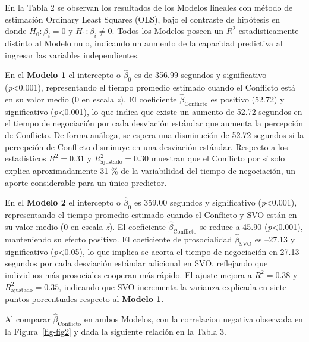 \documentclass[
  spanish,
  10pt,
]{article}
\begin{document}
En la Tabla 2 se observan los resultados de los Modelos lineales con
método de estimación Ordinary Least Squares (OLS), bajo el contraste de
hipótesis en donde \(H_0:\beta_i=0\) y \(H_1:\beta_i\neq0\). Todos los
Modelos poseen un \(R^2\) estadisticamente distinto al Modelo nulo,
indicando un aumento de la capacidad predictiva al ingresar las
variables independientes.

En el \textbf{Modelo 1} el intercepto o \(\hat{\beta}_0\) es de 356.99
segundos y significativo (\emph{p}\textless0.001), representando el
tiempo promedio estimado cuando el Conflicto está en su valor medio (0
en escala \emph{z}). El coeficiente \(\hat{\beta}_{\text{Conflicto}}\)
es positivo (52.72) y significativo (\emph{p}\textless0.001), lo que
indica que existe un aumento de 52.72 segundos en el tiempo de
negociación por cada desviación estándar que aumenta la percepción de
Conflicto. De forma análoga, se espera una disminución de 52.72 segundos
si la percepción de Conflicto disminuye en una desviación estándar.
Respecto a los estadísticos \(R^2 = 0.31\) y
\(R^2_{\text{ajustado}} = 0.30\) muestran que el Conflicto por sí solo
explica aproximadamente 31 \% de la variabilidad del tiempo de
negociación, un aporte considerable para un único predictor.

En el \textbf{Modelo 2} el intercepto o \(\hat{\beta}_0\) es 359.00
segundos y significativo (\emph{p}\textless0.001), representando el
tiempo promedio estimado cuando el Conflicto y SVO están en su valor
medio (0 en escala \emph{z}). El coeficiente
\(\hat{\beta}_{\text{Conflicto}}\) se reduce a 45.90
(\emph{p}\textless0.001), manteniendo su efecto positivo. El coeficiente
de prosocialidad \(\hat{\beta}_{\text{SVO}}\) es --27.13 y significativo
(\emph{p}\textless0.05), lo que implica se acorta el tiempo de
negociación en 27.13 segundos por cada desviación estándar adicional en
SVO, reflejando que individuos más prosociales cooperan más rápido. El
ajuste mejora a \(R^2 = 0.38\) y \(R^2_{\text{ajustado}} = 0.35\),
indicando que SVO incrementa la varianza explicada en siete puntos
porcentuales respecto al \textbf{Modelo 1}.

Al comparar \(\hat{\beta}_{\text{Conflicto}}\) en ambos Modelos, con la
correlacion negativa observada en la Figura~\ref{fig-fig2} y dada la
siguiente relación en la Tabla 3.
\end{document}
